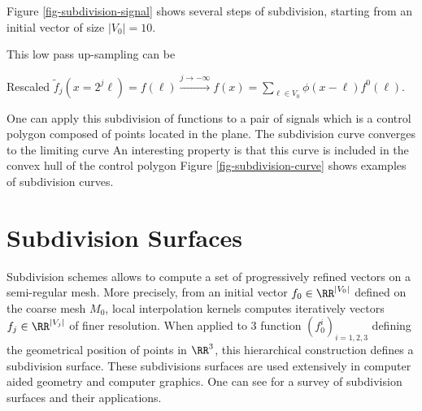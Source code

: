 Figure \ref{fig-subdivision-signal} shows several steps of subdivision, starting from an initial vector of size $|V_0|=10$.


This low pass up-sampling can be 

Rescaled $\tilde f_j(x=2^j \ell) = f(\ell) \overset{j \rightarrow -\infty}{\longrightarrow} f(x) = \sum_{\ell \in V_0} \phi(x-\ell)f^0(\ell)$.

\fi

One can apply this subdivision of functions to a pair of signals
which is a control polygon composed of points located in the plane.
The subdivision curve converges to the limiting curve 
An interesting property is that this curve is included in the convex hull of the control polygon
Figure \ref{fig-subdivision-curve} shows examples of subdivision curves.




\section{Subdivision Surfaces}

Subdivision schemes allows to compute a set of progressively refined vectors on a semi-regular mesh. More precisely, from an initial vector $f_0 \in \RR^{|V_0|}$ defined on the coarse mesh $M_0$, local interpolation kernels computes iteratively vectors $f_j \in \RR^{|V_j|}$ of finer resolution. When applied to 3 function $(f_0^i)_{i=1,2,3}$ defining the geometrical position of points in $\RR^3$, this hierarchical construction defines a subdivision surface. These subdivisions surfaces are used extensively in computer aided geometry and computer graphics. One can see \cite{subdivision-course-siggraph} for a survey of subdivision surfaces and their applications.

